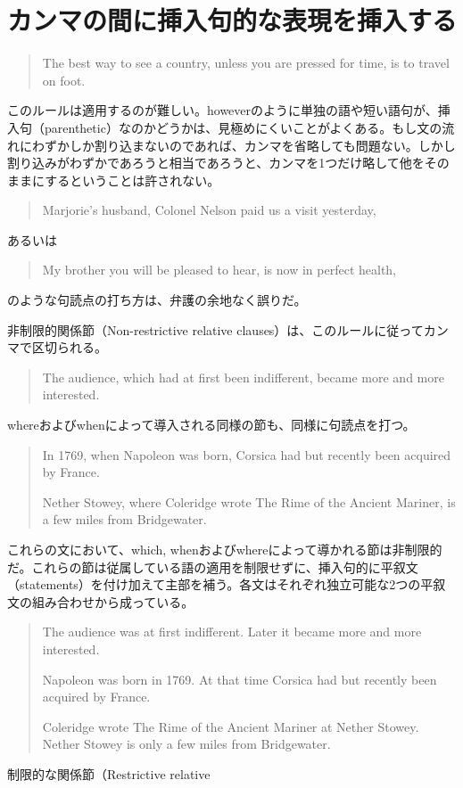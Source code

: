 \section{カンマの間に挿入句的な表現を挿入する}
\begin{quote}
The best way to see a country, unless you are pressed for time, is to
travel on foot.    
\end{quote}
このルールは適用するのが難しい。howeverのように単独の語や短い語句が、挿入句（parenthetic）なのかどうかは、見極めにくいことがよくある。もし文の流れにわずかしか割り込まないのであれば、カンマを省略しても問題ない。しかし割り込みがわずかであろうと相当であろうと、カンマを1つだけ略して他をそのままにするということは許されない。
\begin{quote}
Marjorie's husband, Colonel Nelson paid us a visit yesterday,    
\end{quote}
あるいは
\begin{quote}
My brother you will be pleased to hear, is now in perfect health,    
\end{quote}
のような句読点の打ち方は、弁護の余地なく誤りだ。
\par
非制限的関係節（Non-restrictive relative
clauses）は、このルールに従ってカンマで区切られる。
\begin{quote}
The audience, which had at first been indifferent, became more and more
interested.    
\end{quote}
whereおよびwhenによって導入される同様の節も、同様に句読点を打つ。
\begin{quote}
In 1769, when Napoleon was born, Corsica had but recently been acquired
by France.

Nether Stowey, where Coleridge wrote The Rime of the Ancient Mariner, is
a few miles from Bridgewater.    
\end{quote}
これらの文において、which,
whenおよびwhereによって導かれる節は非制限的だ。これらの節は従属している語の適用を制限せずに、挿入句的に平叙文（statements）を付け加えて主部を補う。各文はそれぞれ独立可能な2つの平叙文の組み合わせから成っている。
\begin{quote}
The audience was at first indifferent. Later it became more and more
interested.

Napoleon was born in 1769. At that time Corsica had but recently been
acquired by France.

Coleridge wrote The Rime of the Ancient Mariner at Nether Stowey. Nether
Stowey is only a few miles from Bridgewater.    
\end{quote}
制限的な関係節（Restrictive relative
